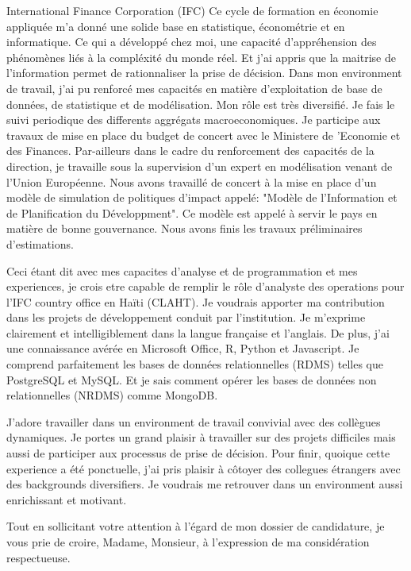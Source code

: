 \documentclass[12pt]{lettre}
\begin{document}
\begin{letter}{
International Finance Corporation (IFC)
}
Ce cycle de formation en \'{e}conomie appliqu\'{e}e m'a donn\'{e} une solide
base en statistique, \'{e}conom\'{e}trie et en informatique. 
Ce qui a d\'{e}velopp\'{e} chez moi, une capacit\'{e} d'appr\'{e}hension 
des ph\'{e}nom\`{e}nes li\'{e}s \`{a} la compl\'{e}xit\'{e} du monde r\'{e}el.
Et j'ai appris que la maitrise de l'information permet de rationnaliser la prise de d\'{e}cision. 
Dans mon environment de travail, j'ai pu renforc\'{e} mes capacit\'{e}s 
en mati\`{e}re d'exploitation de base de donn\'{e}es, de statistique 
et de mod\'{e}lisation. Mon r\^{o}le est tr\`{e}s diversifi\'{e}. Je fais le suivi
periodique des differents aggr\'{e}gats macroeconomiques. Je participe aux travaux de
mise en place du budget de concert avec le Ministere de 'Economie et des Finances. 
Par-ailleurs dans le cadre du renforcement des capacit\'{e}s de la direction, 
je travaille sous la supervision d'un expert en mod\'{e}lisation
venant de l'Union Europ\'{e}enne. 
Nous avons travaill\'{e} de concert \`{a} 
la mise en place d'un mod\`{e}le de simulation de politiques d'impact 
appel\'{e}: "Mod\`{e}le de l'Information et de Planification du D\'{e}veloppment".
Ce mod\`{e}le est appel\'{e} \`{a} servir le pays en mati\`{e}re de bonne gouvernance. 
Nous avons finis les travaux pr\'{e}liminaires d'estimations.

Ceci \'{e}tant dit avec mes capacites d'analyse et de programmation et mes experiences,
je crois etre capable de remplir le r\^{o}le d'analyste des operations pour l'IFC country 
office en Ha\"{i}ti (CLAHT). Je voudrais apporter ma contribution dans les projets de 
d\'{e}veloppement conduit par l'institution. Je m'exprime clairement et intelligiblement 
dans la langue fran\c{c}aise et l'anglais. De plus, j'ai une connaissance av\'{e}r\'{e}e en Microsoft 
Office, R, Python et Javascript. Je comprend parfaitement les bases de donn\'{e}es 
relationnelles (RDMS) telles que PostgreSQL et MySQL. Et je sais comment op\'{e}rer les 
bases de donn\'{e}es non relationnelles (NRDMS) comme MongoDB.

J'adore travailler dans un environment de travail convivial avec des coll\`{e}gues dynamiques. Je portes 
un grand plaisir \`{a} travailler sur des projets difficiles mais aussi de participer aux processus de prise 
de d\'{e}cision. Pour finir, quoique cette experience a \'{e}t\'{e} ponctuelle, j'ai pris plaisir \`{a} c\^{o}toyer 
des collegues \'{e}trangers avec des backgrounds diversifiers. Je voudrais me retrouver dans un environment aussi enrichissant 
et motivant.

\closing{Tout en  sollicitant votre attention \`{a} l'\'{e}gard de mon dossier de candidature, 
je vous prie de croire, Madame, Monsieur, \`{a} l'expression de ma consid\'{e}ration respectueuse.}
\end{letter}
\end{document}
